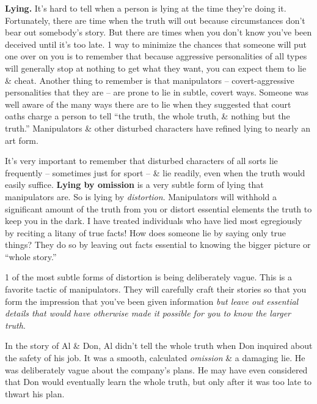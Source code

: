 \documentclass{article}
\numberwithin{equation}{section}
\begin{document}
\textbf{Lying.} It's hard to tell when a person is lying at the time they're doing it. Fortunately, there are time when the truth will out because circumstances don't bear out somebody's story. But there are times when you don't know you've been deceived until it's too late. 1 way to minimize the chances that someone will put one over on you is to remember that because aggressive personalities of all types will generally stop at nothing to get what they want, you can expect them to lie \& cheat. Another thing to remember is that manipulators -- covert-aggressive personalities that they are -- are prone to lie in subtle, covert ways. Someone was well aware of the many ways there are to lie when they suggested that court oaths charge a person to tell ``the truth, the whole truth, \& nothing but the truth.'' Manipulators \& other disturbed characters have refined lying to nearly an art form.

It's very important to remember that disturbed characters of all sorts lie frequently -- sometimes just for sport -- \& lie readily, even when the truth would easily suffice. \textbf{Lying by omission} is a very subtle form of lying that manipulators are. So is lying by \textit{distortion}. Manipulators will withhold a significant amount of the truth from you or distort essential elements the truth to keep you in the dark. I have treated individuals who have lied most egregiously by reciting a litany of true facts! How does someone lie by saying only true things? They do so by leaving out facts essential to knowing the bigger picture or ``whole story.''

1 of the most subtle forms of distortion is being deliberately vague. This is a favorite tactic of manipulators. They will carefully craft their stories so that you form the impression that you've been given information \textit{but leave out essential details that would have otherwise made it possible for you to know the larger truth}.

In the story of Al \& Don, Al didn't tell the whole truth when Don inquired about the safety of his job. It was a smooth, calculated \textit{omission} \& a damaging lie. He was deliberately vague about the company's plans. He may have even considered that Don would eventually learn the whole truth, but only after it was too late to thwart his plan.
\end{document}
